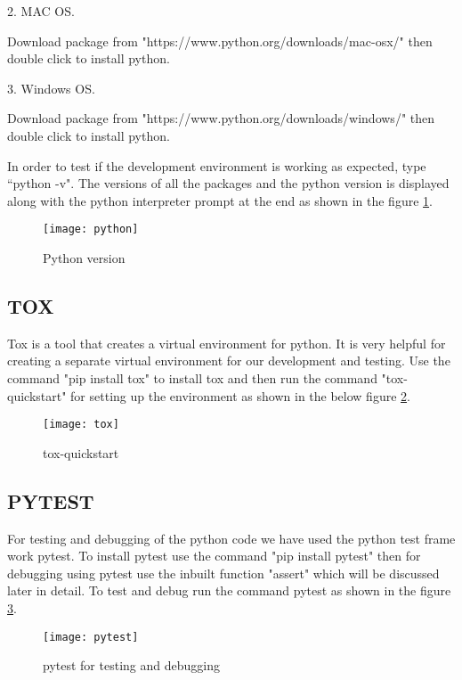 2. MAC OS.

Download package from "https://www.python.org/downloads/mac-osx/" then double click to install python.

3. Windows OS.

Download package from "https://www.python.org/downloads/windows/" then double click to install python. 


In order to test if the development environment is working as expected, type ``python -v". The versions of all the packages and the python version is displayed along with the python interpreter prompt at the end as shown in the figure \ref{fig:3}.

\begin{figure}[h]
    \centering
    \texttt{[image: python]}
    \caption{Python version}
    \label{fig:3}
\end{figure}


\subsection{TOX}
Tox is a tool that creates a virtual environment for python. It is very helpful for creating a separate virtual environment for our development and testing.  Use the command "pip install tox" to install tox and then run the command "tox-quickstart" for setting up the environment as shown in the below figure \ref{fig:4}.

\begin{figure}[h]
    \centering
    \texttt{[image: tox]}
    \caption{tox-quickstart}
    \label{fig:4}
\end{figure}

\subsection{PYTEST}

For testing and debugging of the python code we have used the python test frame work pytest. To install pytest use the command "pip install pytest" then for debugging using pytest use the inbuilt function "assert" which will be discussed later in detail. To test and debug run the command pytest as shown in the figure \ref{fig:5}.

\begin{figure}[h]
    \centering
    \texttt{[image: pytest]}
    \caption{pytest for testing and debugging}
    \label{fig:5}
\end{figure}

\newpage
